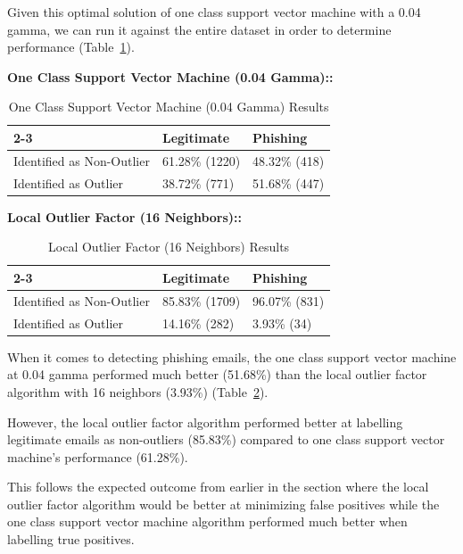 \documentclass[article,pdftex,10pt,a4paper,twocolumn]{article}
\begin{document}
Given this optimal solution of one class support vector machine with a 0.04 gamma, we can run it against the entire dataset in order to determine performance (Table~\ref{svmtable}).

\newpage
\textbf{One Class Support Vector Machine (0.04 Gamma)::}

\begin{table}[h]
        \caption{One Class Support Vector Machine (0.04 Gamma) Results}
\begin{tabular}{l|l|l|}
\cline{2-3}
                                                & Legitimate     & Phishing      \\ \hline
\multicolumn{1}{|l|}{Identified as Non-Outlier} & 61.28\% (1220) & 48.32\% (418) \\ \hline
\multicolumn{1}{|l|}{Identified as Outlier}     & 38.72\% (771)  & 51.68\% (447) \\ \hline
\end{tabular}
\label{svmtable}
\end{table}

\textbf{Local Outlier Factor (16 Neighbors)::}

\begin{table}[htp]
\caption{Local Outlier Factor (16 Neighbors) Results}
\begin{tabular}{l|l|l|}
\cline{2-3}
                                                & Legitimate     & Phishing      \\ \hline
\multicolumn{1}{|l|}{Identified as Non-Outlier} & 85.83\% (1709) & 96.07\% (831) \\ \hline
\multicolumn{1}{|l|}{Identified as Outlier}     & 14.16\% (282)  & 3.93\% (34)   \\ \hline
\end{tabular}
\label{loftable}
\end{table}

When it comes to detecting phishing emails, the one class support vector machine at 0.04 gamma performed much better (51.68\%) than the local outlier factor algorithm with 16 neighbors (3.93\%) (Table~\ref{loftable}).

However, the local outlier factor algorithm performed better at labelling legitimate emails as non-outliers (85.83\%) compared to one class support vector machine’s performance (61.28\%).

This follows the expected outcome from earlier in the section where the local outlier factor algorithm would be better at minimizing false positives while the one class support vector machine algorithm performed much better when labelling true positives.
\end{document}
